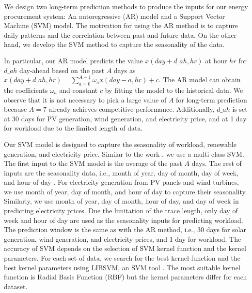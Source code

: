 We design two long-term prediction methods to produce the inputs for
our energy procurement system: An autoregressive (AR) model and a
Support Vector Machine (SVM) model. The motivation for using the AR
method is to capture daily patterns and the correlation between past
and future data. On the other hand, we develop the SVM method to
capture the seasonality of the data.

In particular, our AR model predicts the value $x(day+d\_ah,hr)$ at
hour $hr$ for $d\_ah$ day-ahead based on the past $A$ days as
$x(day+d\_ah,hr) = \sum_{a=0}^{A-1} \omega_a x(day-a,hr) + c.$ The AR
model can obtain the coefficients $\omega_a$ and constant $c$ by
fitting the model to the historical data. We observe that it is not
necessary to pick a large value of $A$ for long-term prediction
because $A=7$ already achieves  competitive
performance. Additionally, $d\_ah$ is set at 30 days for PV
generation, wind generation, and electricity price, and at 1 day for
workload due to the limited length of data.


Our SVM model is designed to capture the seasonality of workload,
renewable generation, and electricity price.
Similar to the work \cite{sharma2011predicting}, we use a multi-class
SVM. The first input to the SVM model is the average of the past $A$
days. The rest of inputs are the seasonality data, i.e., month of
year, day of month, day of week, and hour of day
\cite{deoras2010MatLabForecast}. For electricity generation from PV panels and wind turbines, we use month of year, day of month, and hour of day to
capture their seasonality. Similarly, we use month of year, day of
month, hour of day, and day of week in predicting electricity
prices. Due the limitation of the trace length, only day of week and
hour of day are used as the seasonality inputs for predicting
workload. The prediction window is the same as with the AR method,
i.e., 30 days for solar generation, wind generation, and electricity
prices, and 1 day for workload. The accuracy of SVM depends on the
selection of SVM kernel function and the kernel parameters. For each
set of data, we search for the best kernel function and the best
kernel parameters using LIBSVM, an SVM tool
\cite{chang2011libsvm}. The most suitable kernel function is Radial
Basis Function (RBF) but the kernel parameters differ for each
dataset.



